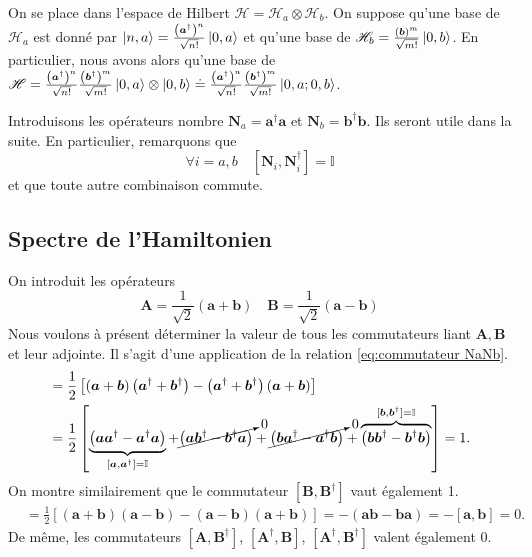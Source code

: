 \documentclass[11pt,oneside,a4paper]{article}
\begin{document}
On se place dans l'espace de Hilbert $\mathcal{H} = \mathcal{H}_a\otimes\mathcal{H}_b$. On suppose qu'une base de $\mathcal{H}_a$ est donné par $\ket{n,a} = \frac{\left(\bm{a}^\dagger\right)^n}{\sqrt{n!}}\ket{0,a}$ et qu'une base de $\mathcal{H}_b = \frac{\left(\bm{b}\right)^m}{\sqrt{m!}}\ket{0,b}$. En particulier, nous avons alors qu'une base de $\mathcal{H} = \frac{\left(\bm{a}^\dagger\right)^n}{\sqrt{n!}}\frac{\left(\bm{b}^\dagger\right)^m}{\sqrt{m!}}\ket{0,a}\otimes\ket{0,b} \doteq \frac{\left(\bm{a}^\dagger\right)^n}{\sqrt{n!}}\frac{\left(\bm{b}^\dagger\right)^m}{\sqrt{m!}}\ket{0,a;0,b}$.

Introduisons les opérateurs nombre $\bm{N}_a = \bm{a}^\dagger\bm{a}$ et $\bm{N}_b = \bm{b}^\dagger\bm{b}$. Ils seront utile dans la suite. En particulier, remarquons que 
\begin{equation}
  \label{eq:commutateur NaNb}
  \forall i=a,b \quad [\bm{N}_i,\bm{N}^\dagger_i] = \mathbb{I} 
\end{equation}
et que toute autre combinaison commute. 

\subsection{Spectre de l'Hamiltonien}
On introduit les opérateurs 
\begin{equation*}
  \bm{A} = \frac{1}{\sqrt{2}}\left(\bm{a}+\bm{b}\right) \quad \bm{B} = \frac{1}{\sqrt{2}}\left(\bm{a}-\bm{b}\right)
\end{equation*}
Nous voulons à présent déterminer la valeur de tous les commutateurs liant $\bm{A},\bm{B}$ et leur adjointe. Il s'agit d'une application de la relation \eqref{eq:commutateur NaNb}.
\begin{align*}
  [\bm{A},\bm{A}^\dagger] &= \frac{1}{2}\left[\left(\bm{a}+\bm{b}\right)\left(\bm{a}^\dagger+\bm{b}^\dagger\right)-\left(\bm{a}^\dagger+\bm{b}^\dagger\right)\left(\bm{a}+\bm{b}\right)\right]\\
  &= \frac{1}{2}\left[\underbrace{\left(\bm{a}\bm{a}^\dagger-\bm{a}^\dagger\bm{a}\right)}_{[\bm{a},\bm{a}^\dagger] = \mathbb{I}}+\cancelto{0}{\left(\bm{a}\bm{b}^\dagger-\bm{b}^\dagger\bm{a}\right)}+\cancelto{0}{\left(\bm{b}\bm{a}^\dagger-\bm{a}^\dagger\bm{b}\right)}+\overbrace{\left(\bm{b}\bm{b}^\dagger-\bm{b}^\dagger\bm{b}\right)}^{[\bm{b},\bm{b}^\dagger] = \mathbb{I}}\right] = 1.
\end{align*}
On montre similairement que le commutateur $[\bm{B},\bm{B}^\dagger]$ vaut également 1.
\begin{align*}
  [\bm{A},\bm{B}] &= \frac{1}{2}\left[\left(\bm{a}+\bm{b}\right)\left(\bm{a}-\bm{b}\right)-\left(\bm{a}-\bm{b}\right)\left(\bm{a}+\bm{b}\right)\right] = -\left(\bm{a}\bm{b}-\bm{b}\bm{a}\right) = -\left[\bm{a},\bm{b}\right] = 0.
\end{align*}
De même, les commutateurs $[\bm{A},\bm{B}^\dagger]$, $[\bm{A}^\dagger,\bm{B}]$, $[\bm{A}^\dagger,\bm{B}^\dagger]$ valent également 0.
\end{document}
